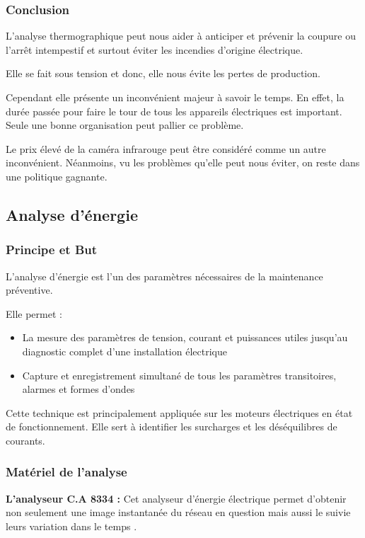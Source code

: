 \subsubsection{Conclusion}
L'analyse thermographique peut nous aider à anticiper et prévenir la coupure ou l'arrêt intempestif et surtout éviter les incendies d'origine électrique.

Elle se fait sous tension et donc, elle nous évite les pertes de production.

Cependant elle présente un inconvénient majeur à savoir le temps. En effet, la durée passée pour faire le tour de tous les appareils électriques est important. Seule une bonne organisation peut pallier ce problème.%

Le prix  élevé de la caméra infrarouge peut être considéré comme un autre inconvénient. Néanmoins, vu les problèmes qu'elle peut nous éviter, on reste dans une politique gagnante.


\subsection{Analyse d'énergie}
\subsubsection{Principe et But}
L'analyse d'énergie est l'un des paramètres nécessaires  de la maintenance  préventive. 

Elle permet :

\begin{itemize}
\item La mesure des paramètres de tension, courant et puissances utiles jusqu'au diagnostic complet d'une installation électrique

\item Capture et enregistrement simultané de tous les paramètres transitoires,  alarmes et formes d'ondes
\end{itemize}

Cette technique est principalement appliquée sur les moteurs électriques en état de fonctionnement.
Elle sert à identifier les surcharges et les déséquilibres de courants.

\subsubsection{Matériel de l'analyse}


\textbf{L'analyseur C.A 8334 : }
Cet analyseur d'énergie électrique permet d'obtenir non seulement une image instantanée du réseau en question mais aussi le suivie leurs variation dans le temps \cite{analyseenergie}.

